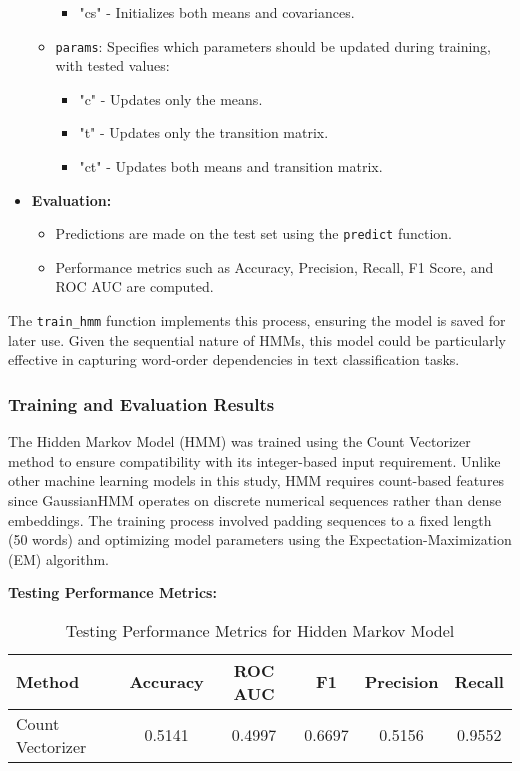 \begin{itemize}
\begin{itemize}
\begin{itemize}
                    \item "cs" - Initializes both means and covariances.
                \end{itemize}
            \item \texttt{params}: Specifies which parameters should be updated during training, with tested values:
                \begin{itemize}
                    \item "c" - Updates only the means.
                    \item "t" - Updates only the transition matrix.
                    \item "ct" - Updates both means and transition matrix.
                \end{itemize}
        \end{itemize}
    \item \textbf{Evaluation:}
        \begin{itemize}
            \item Predictions are made on the test set using the \texttt{predict} function.
            \item Performance metrics such as Accuracy, Precision, Recall, F1 Score, and ROC AUC are computed.
        \end{itemize}
\end{itemize}

The \texttt{train\_hmm} function implements this process, ensuring the model is saved for later use. Given the sequential nature of HMMs, this model could be particularly effective in capturing word-order dependencies in text classification tasks.

\subsubsection{Training and Evaluation Results}

The Hidden Markov Model (HMM) was trained using the Count Vectorizer method to ensure compatibility with its integer-based input requirement. Unlike other machine learning models in this study, HMM requires count-based features since GaussianHMM operates on discrete numerical sequences rather than dense embeddings. The training process involved padding sequences to a fixed length (50 words) and optimizing model parameters using the Expectation-Maximization (EM) algorithm.

\textbf{Testing Performance Metrics:}

\begin{table}[H]
    \centering
    \caption{Testing Performance Metrics for Hidden Markov Model}
    \label{tab:hmm-testing-metrics}
    \begin{tabular}{|l|c|c|c|c|c|}
        \hline
        \textbf{Method} & \textbf{Accuracy} & \textbf{ROC AUC} & \textbf{F1} & \textbf{Precision} & \textbf{Recall} \\ 
        \hline
        Count Vectorizer & 0.5141 & 0.4997 & 0.6697 & 0.5156 & 0.9552 \\ 
        \hline
    \end{tabular}
\end{table}


